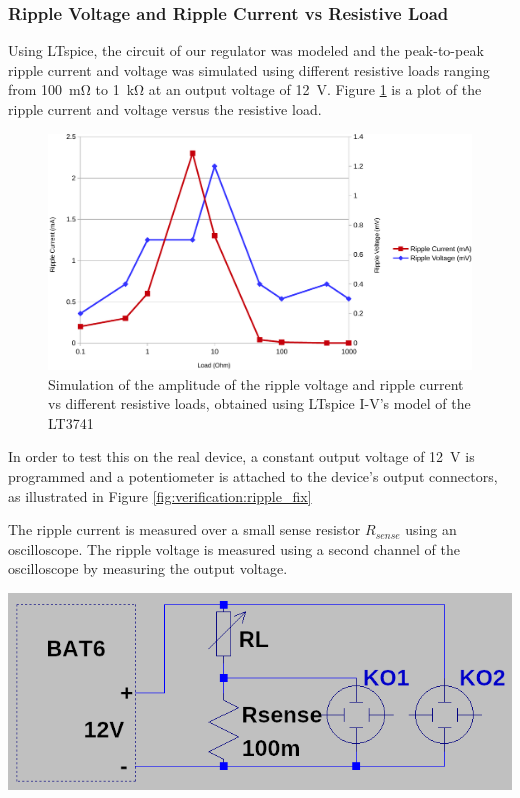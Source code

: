 \subsubsection{Ripple Voltage and Ripple Current vs Resistive Load}

Using LTspice\cite{ref:ltspice}, the circuit  of  our  regulator was modeled and
the  peak-to-peak  ripple  current  and  voltage  was  simulated using different
resistive  loads ranging from \SI{100}{\milli\ohm} to  \SI{1}{\kilo\ohm}  at  an
output  voltage of \SI{12}{\volt}. Figure \ref{fig:verification:ripple_sim} is a
plot  of  the   ripple   current   and   voltage   versus  the  resistive  load.

\begin{figure}[th!]
    \centering
    \includegraphics[width=.7\textwidth]{images/sim/ripple-vs-load.pdf}
    \caption{Simulation of the amplitude of the ripple voltage and ripple current vs different resistive loads, obtained using LTspice I-V's model of the LT3741}
    \label{fig:verification:ripple_sim}
\end{figure}

\begin{minipage}{0.5\textwidth}
    In  order   to  test  this   on  the   real  device,  a   constant  output
    voltage   of  \SI{12}{\volt}   is  programmed   and  a   potentiometer  is
    attached  to the  device's  output connectors,  as  illustrated in  Figure
    \ref{fig:verification:ripple_fix}

    The ripple  current is  measured over a  small sense  resistor $R_{sense}$
    using  an oscilloscope. The  ripple  voltage is  measured  using a  second
    channel of the oscilloscope by measuring the output voltage.
\end{minipage}
\begin{minipage}{0.5\textwidth}
    \centering
    \includegraphics[width=.9\textwidth]{images/sim/ripple-fixture.png}
    \label{fig:verification:ripple_fix}
\end{minipage}

